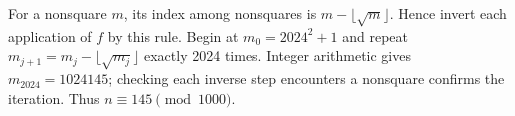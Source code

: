 For a nonsquare $m$, its index among nonsquares is $m-\lfloor\sqrt m\rfloor$. Hence invert each application of $f$ by this rule. Begin at $m_0=2024^2+1$ and repeat $m_{j+1}=m_j-\lfloor\sqrt{m_j}\rfloor$ exactly 2024 times. Integer arithmetic gives $m_{2024}=1024145$; checking each inverse step encounters a nonsquare confirms the iteration. Thus $\boxed{n\equiv145\pmod{1000}}$.
